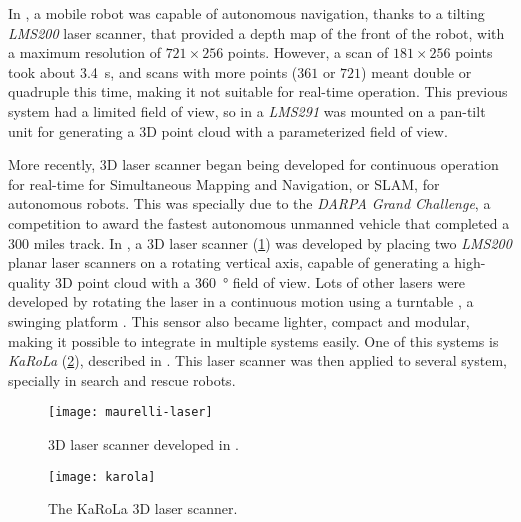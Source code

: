 In \cite{surmann2003}, a mobile robot was capable of autonomous navigation, thanks to a tilting \textit{LMS200} laser scanner, that provided a depth map of the front of the robot, with a maximum resolution of $721\times256$ points. However, a scan of $181\times256$ points took about \SI{3.4}{\second}, and scans with more points ($361$ or $721$) meant double or quadruple this time, making it not suitable for real-time operation. This previous system had a limited field of view, so in \cite{zcai05} a \textit{LMS291} was mounted on a pan-tilt unit for generating a 3D point cloud with a parameterized field of view.

More recently, 3D laser scanner began being developed for continuous operation for real-time for Simultaneous Mapping and Navigation, or SLAM, for autonomous robots. This was specially due to the \textit{DARPA Grand Challenge}, a competition to award the fastest autonomous unmanned vehicle that completed a 300 miles track. In \cite{maurelli2009}, a 3D laser scanner (\cref{fig:maurelli-laser-scanner}) was developed by placing two \textit{LMS200} planar laser scanners on a rotating vertical axis, capable of generating a high-quality 3D point cloud with a \SI{360}{\degree} field of view. Lots of other lasers were developed by rotating the laser in a continuous motion using a turntable \cite{nemoto2007}, a swinging platform \cite{yoshida11}. This sensor also became lighter, compact and modular, making it possible to integrate in multiple systems easily. One of this systems is \textit{KaRoLa} (\cref{fig:karola}), described in \cite{karola14}. This laser scanner was then applied to several system, specially in search and rescue robots.

\begin{figure}[h]
    \centering
    \texttt{[image: maurelli-laser]}
    \caption{3D laser scanner developed in \cite{maurelli2009}.}
    \label{fig:maurelli-laser-scanner}
\end{figure}

\begin{figure}[h]
    \centering
    \texttt{[image: karola]}
    \caption{The KaRoLa 3D laser scanner.}
    \label{fig:karola}
\end{figure}

